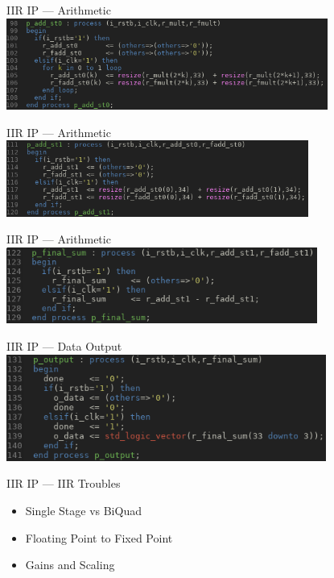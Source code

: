 \documentclass{beamer}
\begin{document}
\begin{frame}{IIR IP --- Arithmetic}
  \includegraphics[height=3cm]
                  {add0.png}
\end{frame}
\begin{frame}{IIR IP --- Arithmetic}
  \includegraphics[height=2.5cm]
                  {add1.png}
\end{frame}
\begin{frame}{IIR IP --- Arithmetic}
  \includegraphics[height=2.5cm]
                  {final-add.png}
\end{frame}
\begin{frame}{IIR IP --- Data Output}
  \includegraphics[height=3.5cm]
                  {output.png}
\end{frame}
\begin{frame}{IIR IP --- IIR Troubles }
  \begin{itemize}[<+>]
  \item Single Stage vs BiQuad
  \item Floating Point to Fixed Point
  \item Gains and Scaling
  \end{itemize}
\end{frame}
\end{document}

